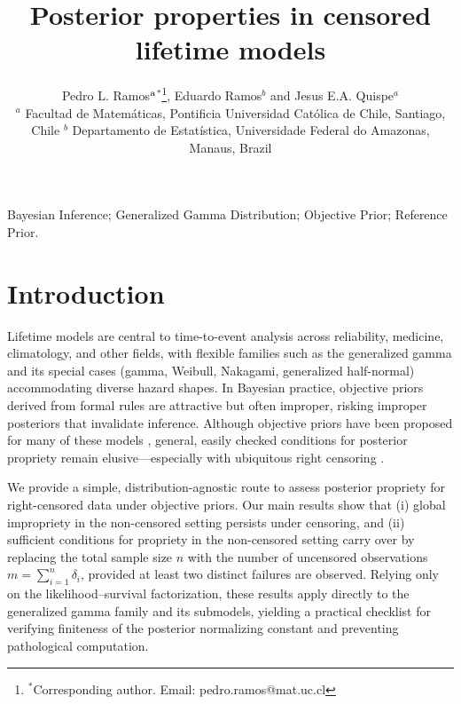 \documentclass[]{interact}
\theoremstyle{plain}%
\theoremstyle{definition}
\theoremstyle{remark}
\begin{document}

\title{Posterior properties in censored lifetime models}

\author{Pedro L. Ramos$^{\rm a}$$^{\ast}$\thanks{$^\ast$Corresponding author. Email: pedro.ramos@mat.uc.cl
\vspace{6pt}}, Eduardo Ramos$^{b}$ and Jesus E.A. Quispe$^{a}$ 
\\ \vspace{6pt} 
$^{a}$ {Facultad de Matem\'aticas, Pontificia Universidad Cat\'olica
de Chile, Santiago, Chile}
$^{b}$ {Departamento de Estat\'istica, Universidade Federal do Amazonas, Manaus, Brazil} \\%
}


\maketitle

\begin{abstract}

\end{abstract}

\begin{keywords}
Bayesian Inference; Generalized Gamma Distribution; Objective Prior; Reference Prior.
\end{keywords}

\section{Introduction}
Lifetime models are central to time-to-event analysis across reliability, medicine, climatology, and other fields, with flexible families such as the generalized gamma and its special cases (gamma, Weibull, Nakagami, generalized half-normal) accommodating diverse hazard shapes. In Bayesian practice, objective priors derived from formal rules \citep{kass1996selection} are attractive but often improper, risking improper posteriors that invalidate inference. Although objective priors have been proposed for many of these models \citep{miller1980bayesian,van2001bayes,ramos2017bayesian}, general, easily checked conditions for posterior propriety remain elusive—especially with ubiquitous right censoring \citep{northrop2016}.

We provide a simple, distribution-agnostic route to assess posterior propriety for right-censored data under objective priors. Our main results show that (i) global impropriety in the non-censored setting persists under censoring, and (ii) sufficient conditions for propriety in the non-censored setting carry over by replacing the total sample size $n$ with the number of uncensored observations $m=\sum_{i=1}^n \delta_i$, provided at least two distinct failures are observed. Relying only on the likelihood–survival factorization, these results apply directly to the generalized gamma family and its submodels, yielding a practical checklist for verifying finiteness of the posterior normalizing constant and preventing pathological computation.
\end{document}
